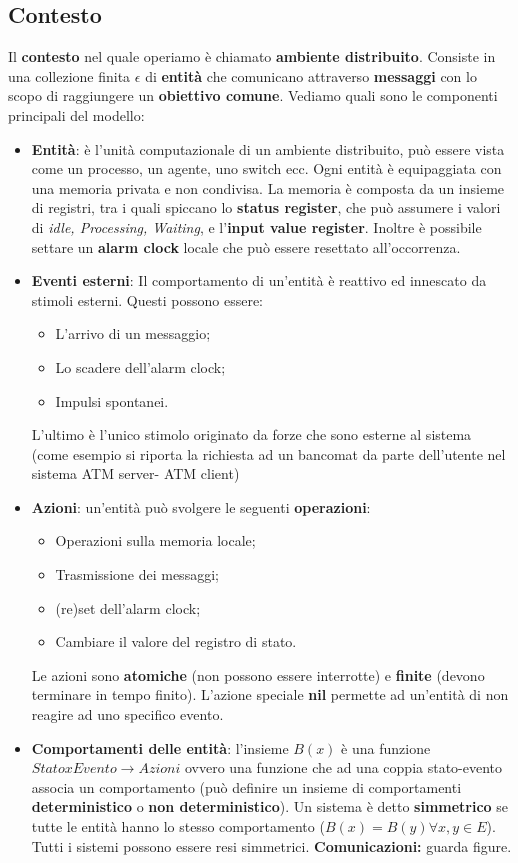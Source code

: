 \documentclass[12pt]{article}
\begin{document}
	\subsection{Contesto}
		Il \textbf{contesto} nel quale operiamo è chiamato \textbf{ambiente distribuito}. Consiste in una collezione finita $\epsilon$ di \textbf{entità} che comunicano attraverso \textbf{messaggi} con lo scopo di raggiungere un \textbf{obiettivo comune}. Vediamo quali sono le componenti principali del modello:
		\begin{itemize}
			\item \textbf{Entità}: è l'unità computazionale di un ambiente distribuito, può essere vista come un processo, un agente, uno switch ecc. Ogni entità è equipaggiata con una memoria privata e non condivisa. La memoria è composta da un insieme di registri, tra i quali spiccano lo \textbf{status register}, che può assumere i valori di \textit{idle, Processing, Waiting}, e l'\textbf{input value register}. Inoltre è possibile settare un \textbf{alarm clock} locale che può essere resettato all'occorrenza.
			\item \textbf{Eventi esterni}: Il comportamento di un'entità è reattivo ed innescato da stimoli esterni. Questi possono essere:
			\begin{itemize}
				\item L'arrivo di un messaggio;
				\item Lo scadere dell'alarm clock;
				\item Impulsi spontanei.
			\end{itemize}
			L'ultimo è l'unico stimolo originato da forze che sono esterne al sistema (come esempio si riporta la richiesta ad un bancomat da parte dell'utente nel sistema ATM server- ATM client)
			\item \textbf{Azioni}: un'entità può svolgere le seguenti \textbf{operazioni}:
		\begin{itemize}
			\item Operazioni sulla memoria locale;
			\item Trasmissione dei messaggi;
			\item (re)set dell'alarm clock;
			\item Cambiare il valore del registro di stato.
		\end{itemize}
			Le azioni sono \textbf{atomiche} (non possono essere interrotte) e \textbf{finite} (devono terminare in tempo finito). L'azione speciale \textbf{nil} permette ad un'entità di non reagire ad uno specifico evento.
			\item \textbf{Comportamenti delle entità}: l'insieme $B(x)$ è una funzione $Statox Evento \rightarrow Azioni$ ovvero una funzione che ad una coppia stato-evento associa un comportamento (può definire un insieme di comportamenti \textbf{deterministico} o \textbf{non deterministico}). Un sistema è detto \textbf{simmetrico} se tutte le entità hanno lo stesso comportamento ($B(x) = B(y) \forall x,y \in E$). Tutti i sistemi possono essere resi simmetrici.
			\textbf{Comunicazioni:} guarda figure.
		\end{itemize}
\end{document}
